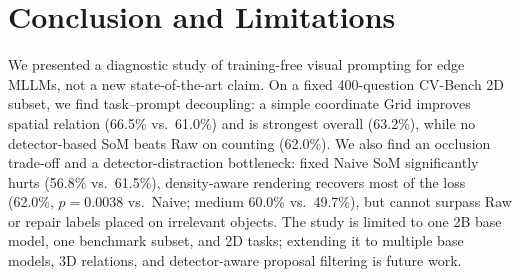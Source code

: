 \documentclass[10pt,twocolumn]{article}
\begin{document}
\section{Conclusion and Limitations}
\label{sec:conclusion}
We presented a diagnostic study of training-free visual prompting for edge MLLMs, not a new state-of-the-art claim. On a fixed 400-question CV-Bench 2D subset, we find task--prompt decoupling: a simple coordinate Grid improves spatial relation (66.5\% vs.\ 61.0\%) and is strongest overall (63.2\%), while no detector-based SoM beats Raw on counting (62.0\%). We also find an occlusion trade-off and a detector-distraction bottleneck: fixed Naive SoM significantly hurts (56.8\% vs.\ 61.5\%), density-aware rendering recovers most of the loss (62.0\%, $p=0.0038$ vs.\ Naive; medium 60.0\% vs.\ 49.7\%), but cannot surpass Raw or repair labels placed on irrelevant objects. The study is limited to one 2B base model, one benchmark subset, and 2D tasks; extending it to multiple base models, 3D relations, and detector-aware proposal filtering is future work.



\end{document}
